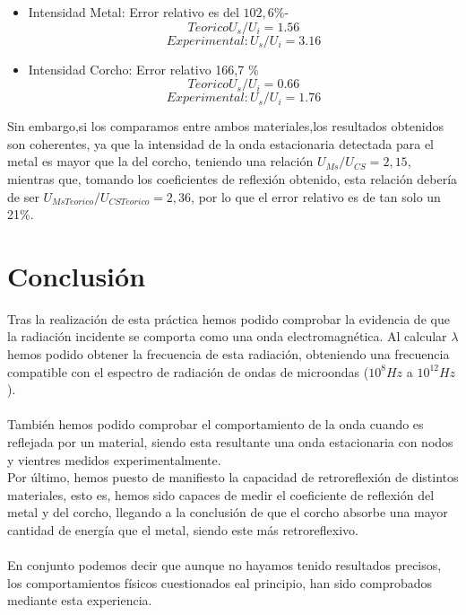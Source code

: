 \documentclass[a4paper,10pt,twocolumns]{article}
\begin{document}
\begin{itemize}
\item Intensidad Metal: Error relativo es del $102,6\%$-
$$Teorico U_s/U_i= 1.56$$
$$Experimental: U_s/U_i=3.16$$
\item Intensidad Corcho: Error relativo 166,7 \%
$$Teorico U_s/U_i= 0.66$$
$$Experimental: U_s/U_i=1.76$$


\end{itemize}
Sin embargo,si los comparamos entre ambos materiales,los resultados obtenidos son coherentes, ya que la intensidad de la onda estacionaria detectada para el metal es mayor que la del corcho, teniendo una relación $U_{Ms}/U_{CS}=2,15$, mientras que, tomando los coeficientes de reflexión obtenido, esta relación debería de ser $U_{Ms Teorico}/U_{CS Teorico} =2,36$, por lo que el error relativo es de tan solo un 21\%.


 \section{Conclusión}
 
 Tras la realización de esta práctica hemos podido comprobar la evidencia de que la radiación incidente se comporta como una onda electromagnética. Al calcular $\lambda$ hemos podido obtener la frecuencia de esta radiación, obteniendo una frecuencia compatible con el espectro de radiación de ondas de microondas ($10^8 Hz$ a $10^{12} Hz$). \\
 \\
 También hemos podido comprobar el comportamiento de la onda cuando es reflejada por un material, siendo esta resultante una onda estacionaria con nodos y vientres medidos experimentalmente.
 \\
 Por último, hemos puesto de manifiesto la capacidad de retroreflexión de distintos materiales, esto es, hemos sido capaces de medir el coeficiente de reflexión del metal y del corcho, llegando a la conclusión de que el corcho absorbe una mayor cantidad de energía que el metal, siendo este más retroreflexivo. \\
 \\
 En conjunto podemos decir que aunque no hayamos tenido resultados precisos, los comportamientos físicos cuestionados eal principio, han sido comprobados mediante esta experiencia.   

\hfill \vfill
\newpage
\end{document}
